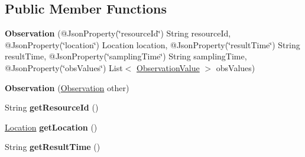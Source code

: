 \subsection*{Public Member Functions}
\begin{DoxyCompactItemize}
\item 
\mbox{\label{classeu_1_1h2020_1_1symbiote_1_1model_1_1cim_1_1Observation_abdae785349fe443cffaa0762667dbb60}} 
{\bfseries Observation} (@Json\+Property(\char`\"{}resource\+Id\char`\"{}) String resource\+Id, @Json\+Property(\char`\"{}location\char`\"{}) Location location, @Json\+Property(\char`\"{}result\+Time\char`\"{}) String result\+Time, @Json\+Property(\char`\"{}sampling\+Time\char`\"{}) String sampling\+Time, @Json\+Property(\char`\"{}obs\+Values\char`\"{}) List$<$ \hyperlink{classeu_1_1h2020_1_1symbiote_1_1model_1_1cim_1_1ObservationValue}{Observation\+Value} $>$ obs\+Values)
\item 
\mbox{\label{classeu_1_1h2020_1_1symbiote_1_1model_1_1cim_1_1Observation_ab9d122a4e9fcd5a37db4e5f122573223}} 
{\bfseries Observation} (\hyperlink{classeu_1_1h2020_1_1symbiote_1_1model_1_1cim_1_1Observation}{Observation} other)
\item 
\mbox{\label{classeu_1_1h2020_1_1symbiote_1_1model_1_1cim_1_1Observation_ac6ed21c82486083484f0d29e40adfe33}} 
String {\bfseries get\+Resource\+Id} ()
\item 
\mbox{\label{classeu_1_1h2020_1_1symbiote_1_1model_1_1cim_1_1Observation_a1cfa805232cd089c697610124f9edb49}} 
\hyperlink{classeu_1_1h2020_1_1symbiote_1_1model_1_1cim_1_1Location}{Location} {\bfseries get\+Location} ()
\item 
\mbox{\label{classeu_1_1h2020_1_1symbiote_1_1model_1_1cim_1_1Observation_a8c071a514f779495e13c8ddccf26dfe0}} 
String {\bfseries get\+Result\+Time} ()
\item 
\mbox{\label{classeu_1_1h2020_1_1symbiote_1_1model_1_1cim_1_1Observation_a8603a1b2e7073db88a8a1a0e412a799a}} 

\end{DoxyCompactItemize}
